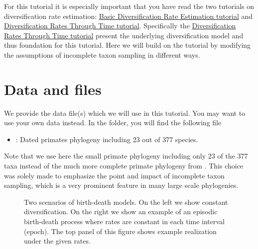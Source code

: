For this tutorial it is especially important that you have read the two tutorials on diversification rate estimation: \href{https://github.com/revbayes/revbayes_tutorial/raw/master/tutorial_TeX/RB_DiversificationRate_Tutorial/RB_DiversificationRate_Tutorial.pdf}{Basic Diversification Rate Estimation tutorial} and \href{https://github.com/revbayes/revbayes_tutorial/raw/master/tutorial_TeX/RB_DiversificationRate_Episodic_Tutorial/RB_DiversificationRate_Episodic_Tutorial.pdf}{Diversification Rates Through Time tutorial}.
Specifically the \href{https://github.com/revbayes/revbayes_tutorial/raw/master/tutorial_TeX/RB_DiversificationRate_Episodic_Tutorial/RB_DiversificationRate_Episodic_Tutorial.pdf}{Diversification Rates Through Time tutorial} present the underlying diversification model and thus foundation for this tutorial.
Here we will build on the tutorial by modifying the assumptions of incomplete taxon sampling in different ways.


\section{Data and files}

We provide the data file(s) which we will use in this tutorial.
You may want to use your own data instead.
In the  folder, you will find the following file
\begin{itemize}
\item {}: Dated primates phylogeny including 23 out of 377 species.
\end{itemize}
Note that we use here the small primate phylogeny including only 23 of the 377 taxa instead of the much more complete primate phylogeny from \cite{Springer2012}.
This choice was solely made to emphasize the point and impact of incomplete taxon sampling, which is a very prominent feature in many large scale phylogenies.


\begin{figure}[!h]
\centering
{}
\caption{\small Two scenarios of birth-death models. On the left we show constant diversification. On the right we show an example of an episodic birth-death process where rates are constant in each time interval (epoch). The top panel of this figure shows example realization under the given rates.}
\label{fig:EBD}
\end{figure}

